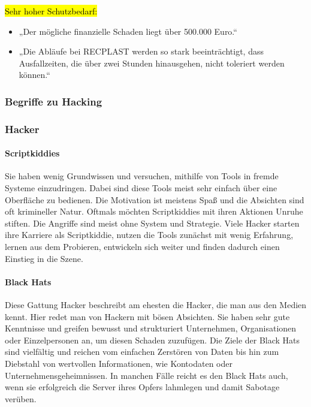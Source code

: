 {\hl{Sehr hoher Schutzbedarf:}}

\begin{itemize}
	\item „Der mögliche finanzielle Schaden liegt über 500.000 Euro.“
	\item „Die Abläufe bei RECPLAST werden so stark beeinträchtigt, dass Ausfallzeiten, die über zwei Stunden hinausgehen, nicht toleriert werden können.“
\end{itemize}

\subsubsection{Begriffe zu Hacking}
\label{sec:Hackingbegriffe}


\subsubsection{Hacker}
\label{sec:Hacker}

\paragraph{Scriptkiddies} Sie haben wenig Grundwissen und versuchen, mithilfe von Tools in fremde Systeme einzudringen. Dabei sind diese Tools meist sehr einfach über eine Oberfläche zu bedienen. Die Motivation ist meistens Spaß und die Absichten sind oft krimineller Natur. Oftmals möchten Scriptkiddies mit ihren Aktionen Unruhe stiften. Die Angriffe sind meist ohne System und Strategie. Viele Hacker starten ihre Karriere als Scriptkiddie, nutzen die Tools zunächst mit wenig Erfahrung, lernen aus dem Probieren, entwickeln sich weiter und finden dadurch einen Einstieg in die Szene.

\paragraph{Black Hats} Diese Gattung Hacker beschreibt am ehesten die Hacker, die man aus den Medien kennt. Hier redet man von Hackern mit bösen Absichten. Sie haben sehr gute Kenntnisse und greifen bewusst und strukturiert Unternehmen, Organisationen oder Einzelpersonen an, um diesen Schaden zuzufügen. Die Ziele der Black Hats sind vielfältig und reichen vom einfachen Zerstören von Daten bis hin zum Diebstahl von wertvollen Informationen, wie Kontodaten oder Unternehmensgeheimnissen. In manchen Fälle reicht es den Black Hats auch, wenn sie erfolgreich die Server ihres Opfers lahmlegen und damit Sabotage verüben.

